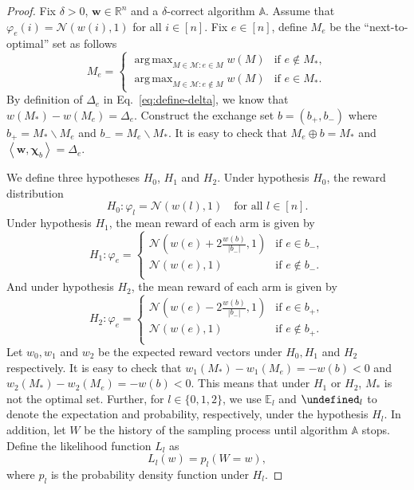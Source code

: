 \documentclass{article}
\newcommand{\Rew}{\varphi}
\newcommand{\E}{\mathbb E}
\newcommand{\M}{\mathcal M}
\newcommand{\diffvalid}{\prec}
\newcommand{\del}{\backslash}
\newcommand{\RR}{\mathbb R}
\newcommand{\Bopt}{\mathcal B_{\mathsf{opt}}}
\DeclareMathOperator*{\argmax}{arg\,max}
\let\Pr\undefined
\DeclareMathOperator{\Pr}{Pr}
\newcommand{\inn}[1]{\left\langle #1 \right\rangle}
\renewcommand{\vec}[1]{\boldsymbol{#1}}
\begin{document}
\begin{proof}
Fix $\delta >0$, $\vec w\in \RR^{n}$ and a $\delta$-correct algorithm $\mathbb A$.
Assume that $\Rew_e(i)=\mathcal N(w(i),1)$ for all $i\in[n]$.
Fix $e\in [n]$, define $M_e$ be the ``next-to-optimal'' set as follows 
$$
M_e = \begin{cases}
		 \argmax_{M\in \M: e \in M} w(M) & \text{if } e\not \in M_*, \\
	     \argmax_{M\in \M: e \not\in M} w(M) & \text{if } e\in M_*.
	  \end{cases}
$$
By definition of $\Delta_e$ in Eq.~\eqref{eq:define-delta}, we know that $w(M_*)-w(M_e)=\Delta_e$.
Construct the exchange set $b=(b_+, b_-)$ where $b_+ = M_*\del M_e$ and $b_- = M_e \del M_*$. 
It is easy to check that $M_e \oplus b = M_*$ and $\inn{\vec w, \vec\chi_b}=\Delta_e$.






We define three hypotheses $H_0$, $H_1$ and $H_2$. 
Under hypothesis $H_0$, the reward distribution 
$$
H_0: \Rew_l = \mathcal N(w(l),1) \quad \text{for all } l \in [n].
$$
Under hypothesis $H_1$, the mean reward of each arm is given by 
$$
H_1: \Rew_e = \begin{cases}
	\mathcal N\left(w(e)+2\frac{w(b)}{|b_-|},1\right) & \text{if } e\in b_-,\\
	\mathcal N(w(e), 1) & \text{if } e\not\in b_-.\\
    \end{cases}
$$
And under hypothesis $H_2$, the mean reward of each arm is given by 
$$
H_2: \Rew_e = \begin{cases}
	\mathcal N\left(w(e)-2\frac{w(b)}{|b_-|},1\right)  & \text{if } e\in b_+,\\
	\mathcal N(w(e), 1)  & \text{if } e\not\in b_+.\\
    \end{cases}
$$
Let $w_0, w_1$ and $w_2$ be the expected reward vectors under $H_0,H_1$ and $H_2$ respectively.
It is easy to check that 
$w_1(M_*)-w_1(M_e) = -w(b) < 0$ and
$w_2(M_*)-w_2(M_e) = -w(b) < 0$.
This means that under $H_1$ or $H_2$, $M_*$ is not the optimal set.
Further, for $l\in \{0,1,2\}$, we use $\E_l$ and $\Pr_l$ to denote the expectation and probability, respectively, under the hypothesis $H_l$.
In addition, let $W$ be the history of the sampling process until algorithm $\mathbb A$ stops.
Define the likelihood function $L_l$ as 
$$
L_l(w) = p_l(W=w),
$$
where $p_l$ is the probability density function under $H_l$.



\end{proof}
\end{document}
